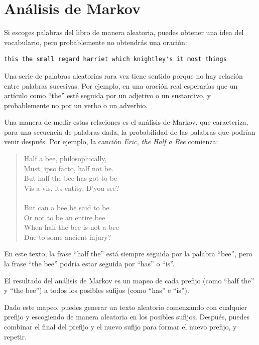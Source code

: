 \documentclass[10pt]{book}
\begin{document}
\section{Análisis de Markov}
\label{markov}

Si escoges palabras del libro de manera aleatoria, puedes obtener una
idea del vocabulario, pero probablemente no obtendrás una oración:

\begin{verbatim}
this the small regard harriet which knightley's it most things
\end{verbatim}
%
Una serie de palabras aleatorias rara vez tiene sentido porque
no hay relación entre palabras sucesivas.  Por ejemplo, en
una oración real esperarías que un artículo como ``the'' esté
seguida por un adjetivo o un sustantivo, y probablemente no por un verbo
o un adverbio.

Una manera de medir estas relaciones es el análisis de
Markov, que
caracteriza, para una secuencia de palabras dada, la probabilidad de las
palabras que podrían venir después.  Por ejemplo, la canción {\em Eric, the Half a
  Bee} comienza:

\begin{quote}
Half a bee, philosophically, \\
Must, ipso facto, half not be. \\
But half the bee has got to be \\
Vis a vis, its entity. D'you see? \\
\\
But can a bee be said to be \\
Or not to be an entire bee \\
When half the bee is not a bee \\
Due to some ancient injury? \\
\end{quote}
%
En este texto,
la frase ``half the'' está siempre seguida por la palabra ``bee'',
pero la frase ``the bee'' podría estar seguida por
``has'' o ``is''.

El resultado del análisis de Markov es un mapeo de cada prefijo
(como ``half the'' y ``the bee'') a todos los posibles sufijos
(como ``has'' e ``is'').

Dado este mapeo, puedes generar un texto aleatorio
comenzando con cualquier prefijo y escogiendo de manera aleatoria
en los posibles sufijos.  Después, puedes combinar el final del
prefijo y el nuevo sufijo para formar el nuevo prefijo, y repetir.
\end{document}
